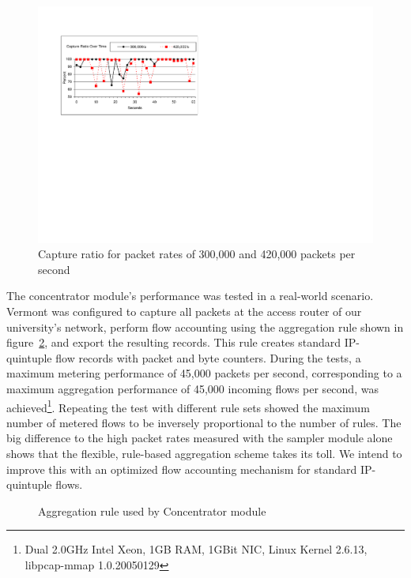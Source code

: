 \begin{figure}
\begin{center}
\includegraphics[scale=0.7]{gfx/sampler-perf3.pdf}
\caption{Capture ratio for packet rates of 300,000 and 420,000 packets per second}
\label{fig_perf_sampler}
\end{center}
\end{figure}

The concentrator module's performance was tested in a real-world scenario.
Vermont was configured to capture all packets at the access router of our university's network, perform flow accounting using the aggregation rule shown in figure~\ref{fig_rule}, and export the resulting records.
This rule creates standard IP-quintuple flow records with packet and byte counters.
During the tests, a maximum metering performance of 45,000 packets per second, corresponding to a maximum aggregation performance of 45,000 incoming flows per second, was achieved\footnote{Dual 2.0GHz Intel Xeon, 1GB RAM, 1GBit NIC, Linux Kernel 2.6.13, libpcap-mmap 1.0.20050129}. 
Repeating the test with different rule sets showed the maximum number of metered flows to be inversely proportional to the number of rules.
The big difference to the high packet rates measured with the sampler module alone shows that the flexible, rule-based aggregation scheme takes its toll.
We intend to improve this with an optimized flow accounting mechanism for standard IP-quintuple flows. 

\begin{figure}
\centering
{}
\caption{Aggregation rule used by Concentrator module}
\label{fig_rule}
\end{figure}



